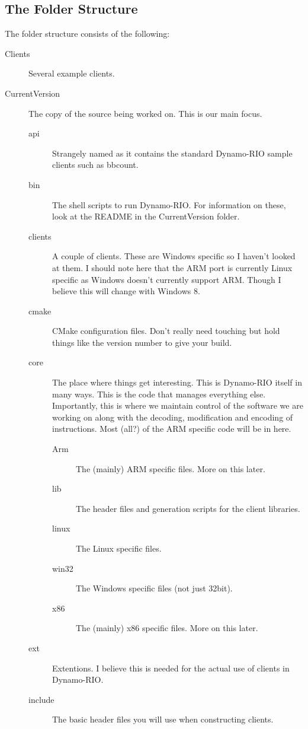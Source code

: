 \documentclass[a4paper]{article}
\begin{document}
\subsection{The Folder Structure}
The folder structure consists of the following:
\begin{description}
\item[Clients] Several example clients.
\item[CurrentVersion] The copy of the source being worked on. This is our main
focus.
	\begin{description}
	\item[api] Strangely named as it contains the standard Dynamo-RIO sample clients
	such as bbcount.
	\item[bin] The shell scripts to run Dynamo-RIO. For information on these, look
	at the README in the CurrentVersion folder.
	\item[clients] A couple of clients. These are Windows specific so I haven't
	looked at them. I should note here that the ARM port is currently Linux specific
	as Windows doesn't currently support ARM. Though I believe this will change with
	Windows 8.
	\item[cmake] CMake configuration files. Don't really need touching but hold
	things like the version number to give your build.
	\item[core] The place where things get interesting. This is Dynamo-RIO itself in
	many ways. This is the code that manages everything else. Importantly, this is
	where we maintain control of the software we are working on along with the
	decoding, modification and encoding of instructions. Most (all?) of the ARM
	specific code will be in here.
	\begin{description}
		\item[Arm] The (mainly) ARM specific files. More on this later.
		\item[lib] The header files and generation scripts for the client libraries.
		\item[linux] The Linux specific files.
		\item[win32] The Windows specific files (not just 32bit).
		\item[x86] The (mainly) x86 specific files. More on this later.
	\end{description}
	\item[ext] Extentions. I believe this is needed for the actual use of clients in
	Dynamo-RIO.
	\item[include] The basic header files you will use when constructing clients.

\end{description}
\end{description}
\end{document}
